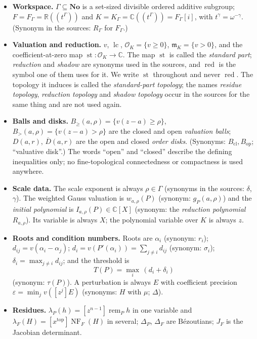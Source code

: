 \documentclass[11pt,letterpaper]{article}
\numberwithin{equation}{section}
\theoremstyle{definition}
\theoremstyle{remark}\newtheorem{remark}[theorem]{Remark}
\newcommand{\No}{\mathbf{No}}
\newcommand{\C}{\mathbb C}
\newcommand{\R}{\mathbb R}
\newcommand{\OO}{\mathcal O}
\newcommand{\mm}{\mathfrak m}
\newcommand{\st}{\operatorname{st}}
\newcommand{\lc}{\operatorname{lc}}
\newcommand{\rem}{\operatorname{rem}}
\newcommand{\NF}{\operatorname{NF}}
\newcommand{\Bge}[2]{B_{\ge}(#1,#2)}
\newcommand{\Bgt}[2]{B_{>}(#1,#2)}
\begin{document}
\begin{itemize}
\item \textbf{Workspace.} $\Gamma\subseteq\No$ is a set-sized divisible
ordered additive subgroup; $F=F_\Gamma=\R((t^\Gamma))$ and
$K=K_\Gamma=\C((t^\Gamma))=F_\Gamma[i]$, with $t^\gamma=\omega^{-\gamma}$.
(Synonym in the sources: $R_\Gamma$ for $F_\Gamma$.)
\item \textbf{Valuation and reduction.} $v$, $\lc$, $\OO_K=\{v\ge0\}$,
$\mm_K=\{v>0\}$, and the coefficient-at-zero map
$\st:\OO_K\to\C$. The map $\st$ is called the \emph{standard part};
\emph{reduction} and \emph{shadow} are synonyms used in the sources, and
$\operatorname{red}$ is the symbol one of them uses for it. We write $\st$ throughout and
never $\operatorname{red}$. The topology it induces is called the \emph{standard-part
topology}; the names \emph{residue topology}, \emph{reduction topology} and
\emph{shadow topology} occur in the sources for the same thing and are not
used again.
\item \textbf{Balls and disks.} $\Bge a\rho=\{v(z-a)\ge\rho\}$,
$\Bgt a\rho=\{v(z-a)>\rho\}$ are the closed and open \emph{valuation balls};
$D(a,r)$, $\overline D(a,r)$ are the open and closed \emph{order disks}.
(Synonyms: $B_{\mathrm{cl}},B_{\mathrm{op}}$; ``valuative disk''.) The words
``open'' and ``closed'' describe the defining inequalities only; no
fine-topological connectedness or compactness is used anywhere.
\item \textbf{Scale data.} The scale exponent is always $\rho\in\Gamma$
(synonyms in the sources: $\delta$, $\gamma$). The weighted Gauss valuation is
$w_{a,\rho}(P)$ (synonym: $g_P(a,\rho)$) and the \emph{initial polynomial} is
$I_{a,\rho}(P)\in\C[X]$ (synonym: the \emph{reduction polynomial}
$R_{a,\rho}$). Its variable is always $X$; the polynomial variable over $K$ is
always $z$.
\item \textbf{Roots and condition numbers.} Roots are $\alpha_i$ (synonym:
$r_i$); $d_{ij}=v(\alpha_i-\alpha_j)$; $d_i=v(P'(\alpha_i))=\sum_{j\ne i}d_{ij}$
(synonym: $\sigma_i$); $\delta_i=\max_{j\ne i}d_{ij}$; and the threshold is
\[
 T(P)=\max_i\,(d_i+\delta_i)
\]
(synonym: $\tau(P)$). A perturbation is always $E$ with coefficient precision
$\varepsilon=\min_j v([z^j]E)$ (synonyms: $H$ with $\mu$; $\Delta$).
\item \textbf{Residues.} $\lambda_P(h)=[z^{n-1}]\rem_P h$ in one variable and
$\lambda_F(H)=[x^{\mathrm{top}}]\NF_F(H)$ in several; $\Delta_P$, $\Delta_F$
are B\'ezoutians; $J_F$ is the Jacobian determinant.
\end{itemize}
\end{document}
